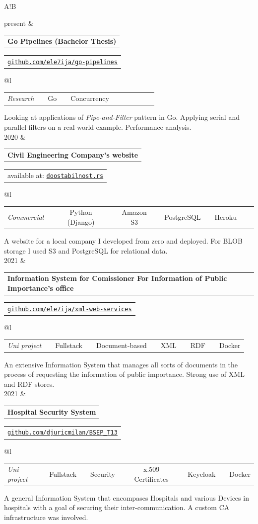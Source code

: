 \documentclass[11pt]{article}
\makeatletter
\newcommand{\VRule}{\color{lightgray}\vrule width 0.5pt}
\newcommand{\projectentry}[5][0.25em]{
	\begin{tabular}{@{}l} %
		{\bfseries #3}	%
	\end{tabular}
	\vspace{0.3em}
	\hfill
	\begin{tabular}{l@{}}
		{#4} %
	\end{tabular} 
	\newline
	\begin{tabular}{@{}l}
		{#2} %
	\end{tabular}

	\vspace{0.25em}
	#5
}
\newcommand{\timelinetableprojects}[1]{
	\begin{longtable}{A!{\VRule}B}
		#1
	\end{longtable}
}
\makeatother
\begin{document}
\timelinetableprojects{
present & \projectentry{\begin{tabular}{@{}l c c c c c c c c c c}\textit{Research} & \textendash & Go & \textendash & Concurrency \end{tabular}}{Go Pipelines (Bachelor Thesis)}{\href{https://github.com/ele7ija/go-pipelines}{\tt github.com/ele7ija/go-pipelines}}
{Looking at applications of \textit{Pipe-and-Filter} pattern in Go. Applying serial and parallel filters on a real-world example. Performance analysis.} \vspace{0.75em} \\ 
2020 & \projectentry{\begin{tabular}{@{}l c c c c c c c c c c}\textit{Commercial} & \textendash & Python (Django) & \textendash & Amazon S3 & \textendash & PostgreSQL & \textendash & Heroku \end{tabular}}{Civil Engineering Company's website}{available at: \href{https://doostabilnost.rs}{\tt doostabilnost.rs}}
{A website for a local company I developed from zero and deployed. For BLOB storage I used S3 and PostgreSQL for relational data.} \vspace{0.75em} \\ 
2021 & \projectentry{\begin{tabular}{@{}l c c c c c c c c c c}\textit{Uni project} & \textendash & Fullstack & \textendash & Document-based  & \textendash & XML & \textendash & RDF & \textendash & Docker \end{tabular}}{Information System for Comissioner For Information of Public Importance's office}{\href{https://github.com/ele7ija/xml-web-services}{\tt github.com/ele7ija/xml-web-services}}
{An extensive Information System that manages all sorts of documents in the process of requesting the information of public importance. Strong use of XML and RDF stores.} \vspace{0.75em} \\
2021 & \projectentry{\begin{tabular}{@{}l c c c c c c c c c c}\textit{Uni project} & \textendash & Fullstack & \textendash & Security  & \textendash & x.509 Certificates & \textendash & Keycloak & \textendash & Docker \end{tabular}}{Hospital Security System}{\href{https://github.com/djuricmilan/BSEP_T13}{\tt github.com/djuricmilan/BSEP\_T13}}
{A general Information System that encompases Hospitals and various Devices in hospitals with a goal of securing their inter-communication. A custom CA infrastructure was involved.}}
\end{document}
